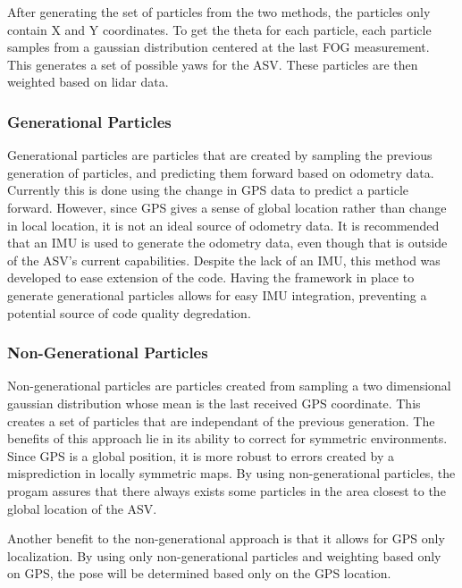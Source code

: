 \documentclass[10pt]{IEEEtran}
\begin{document}
After generating the set of particles from the two methods, the particles only contain X and
Y coordinates.  To get the theta for each particle, each particle samples from a gaussian
distribution centered at the last FOG measurement.  This generates a set of possible yaws
for the ASV.  These particles are then weighted based on lidar data.

\subsubsection{Generational Particles}
Generational particles are particles that are created by sampling the previous generation of
particles, and predicting them forward based on odometry data. Currently this is done using
the change in GPS data to predict a particle forward.  However, since GPS gives a sense of 
global location rather than change in local location, it is not an ideal source of odometry
data.  It is recommended that an IMU is used to generate the odometry data, even though that
is outside of the ASV's current capabilities.  Despite the lack of an IMU, this method was
developed to ease extension of the code.  Having the framework in place to generate 
generational particles allows for easy IMU integration, preventing a potential source of 
code quality degredation.

\subsubsection{Non-Generational Particles}
Non-generational particles are particles created from sampling a two dimensional gaussian
distribution whose mean is the last received GPS coordinate.  This creates a set of particles
that are independant of the previous generation.  The benefits of this approach lie in its 
ability to correct for symmetric environments.  Since GPS is a global position, it is 
more robust to errors created by a misprediction in locally symmetric maps.  
By using non-generational particles, the progam assures that there always exists some 
particles in the area closest to the global location of the ASV. %

Another benefit to the non-generational approach is that it allows for GPS only localization.
By using only non-generational particles and weighting based only on GPS, the pose will 
be determined based only on the GPS location.
\end{document}
